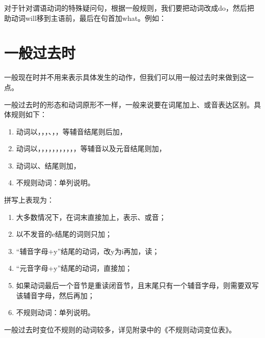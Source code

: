 \documentclass[10.5pt, a4paper]{ctexbook} %
\begin{document}
对于针对谓语动词的特殊疑问句，根据一般规则，我们要把动词改成do，然后把助动词will移到主语前，最后在句首加what。例如：

\begin{liju}
\end{liju}

\section{一般过去时}

一般现在时并不用来表示具体发生的动作，但我们可以用一般过去时来做到这一点。

一般过去时的形态和动词原形不一样，一般来说要在词尾加上、或音表达区别。具体规则如下：

\begin{enumerate}
    \item 动词以，，，、，，等辅音结尾则后加，
    \item 动词以，，，，，，，，，，，等辅音以及元音结尾则加，
    \item 动词以、结尾则加，
    \item 不规则动词：单列说明。
\end{enumerate}

拼写上表现为：
\begin{enumerate}
    \item 大多数情况下，在词末直接加上，表示、或音；
    \item 以不发音的e结尾的词则只加；
    \item “辅音字母+\;y”结尾的动词，改y为i再加，读；
    \item “元音字母+\;y”结尾的动词，直接加；
    \item 如果动词最后一个音节是重读闭音节，且末尾只有一个辅音字母，则需要双写该辅音字母，然后再加；
    \item 不规则动词：单列说明。
\end{enumerate}

一般过去时变位不规则的动词较多，详见附录中的《不规则动词变位表》。
\end{document}
